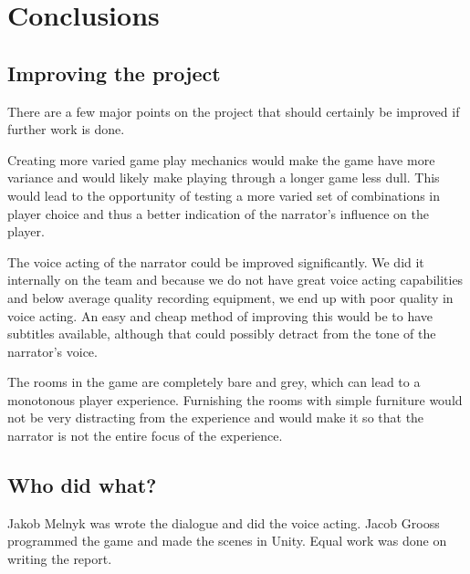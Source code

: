\section{Conclusions}

\subsection{Improving the project}
There are a few major points on the project that should certainly be improved if further work is done. 

Creating more varied game play mechanics would make the game have more variance and would likely make playing through a longer game less dull. This would lead to the opportunity of testing a more varied set of combinations in player choice and thus a better indication of the narrator's influence on the player.

The voice acting of the narrator could be improved significantly. We did it internally on the team and because we do not have great voice acting capabilities and below average quality recording equipment, we end up with poor quality in voice acting. An easy and cheap method of improving this would be to have subtitles available, although that could possibly detract from the tone of the narrator's voice.

The rooms in the game are completely bare and grey, which can lead to a monotonous player experience. Furnishing the rooms with simple furniture would not be very distracting from the experience and would make it so that the narrator is not the entire focus of the experience.

\subsection{Who did what?}
Jakob Melnyk was wrote the dialogue and did the voice acting. Jacob Grooss programmed the game and made the scenes in Unity. Equal work was done on writing the report.